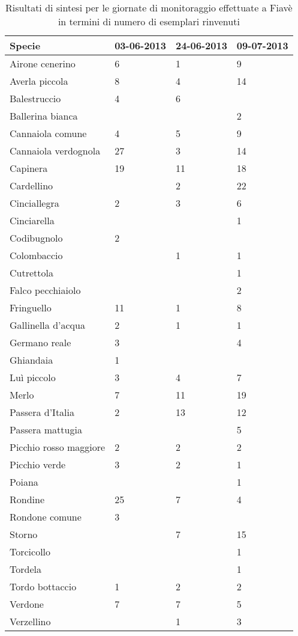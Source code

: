 \documentclass[11pt,a4paper,twoside]{memoir}
\begin{document}
\begin{table}[H]
\centering
\begin{tabular}{llll}
\toprule                
\textbf{  Specie  } & \textbf{  03-06-2013  } & \textbf{  24-06-2013  } & \textbf{  09-07-2013  } \\
\midrule                
  Airone cenerino & 6 & 1 & 9 \\
  Averla piccola  & 8 & 4 & 14  \\
  Balestruccio  & 4 & 6 &   \\
  Ballerina bianca  &   &   & 2 \\
  Cannaiola comune  & 4 & 5 & 9 \\
  Cannaiola verdognola  & 27  & 3 & 14  \\
  Capinera  & 19  & 11  & 18  \\
  Cardellino  &   & 2 & 22  \\
  Cinciallegra  & 2 & 3 & 6 \\
  Cinciarella &   &   & 1 \\
  Codibugnolo & 2 &   &   \\
  Colombaccio &   & 1 & 1 \\
  Cutrettola  &   &   & 1 \\
  Falco pecchiaiolo &   &   & 2 \\
  Fringuello  & 11  & 1 & 8 \\
  Gallinella d'acqua  & 2 & 1 & 1 \\
  Germano reale & 3 &   & 4 \\
  Ghiandaia & 1 &   &   \\
  Luì piccolo & 3 & 4 & 7 \\
  Merlo & 7 & 11  & 19  \\
  Passera d'Italia  & 2 & 13  & 12  \\
  Passera mattugia  &   &   & 5 \\
  Picchio rosso maggiore  & 2 & 2 & 2 \\
  Picchio verde & 3 & 2 & 1 \\
  Poiana  &   &   & 1 \\
  Rondine & 25  & 7 & 4 \\
  Rondone comune  & 3 &   &   \\
  Storno  &   & 7 & 15  \\
  Torcicollo  &   &   & 1 \\
  Tordela &   &   & 1 \\
  Tordo bottaccio & 1 & 2 & 2 \\
  Verdone & 7 & 7 & 5 \\
  Verzellino  &   & 1 & 3 \\
\bottomrule               
\end{tabular}
\caption{Risultati di sintesi per le giornate di monitoraggio effettuate a Fiavè in termini di numero di esemplari rinvenuti}
\end{table}
\end{document}
